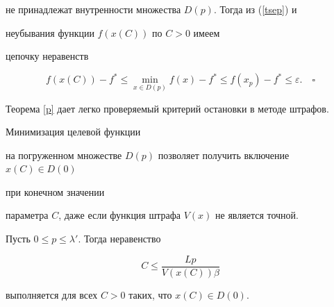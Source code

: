 не принадлежат внутренности множества $D(p)$. Тогда из (\ref{tsep}) и 


неубывания функции $f(x(C))$ по $C>0$ имеем


цепочку неравенств


$$


f(x(C))-f^*\leq\min\limits_{x\in D(p)}f(x)-f^*\leq


f(x_p)-f^*\leq\varepsilon.\quad\square


$$





Теорема \ref{p} дает легко проверяемый критерий остановки в методе штрафов. 


Минимизация целевой функции


на погруженном множестве $D(p)$ позволяет получить включение $x(C)\in D(0)$ 


при конечном значении


параметра $C$, даже если функция штрафа $V(x)$ не является точной.





\begin{thm}\label{C}


Пусть $0\leq p\leq\lambda'$. Тогда неравенство


\begin{equation}\label{C1}


C\leq\frac{Lp}{V(x(C))\beta}


\end{equation}


выполняется для всех $C>0$ таких, что $x(C)\in D(0)$.


\end{thm}





